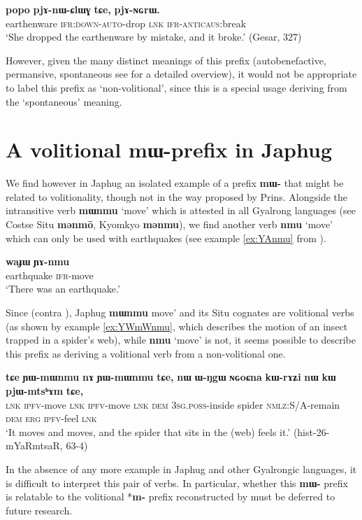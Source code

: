 \documentclass[oneside,a4paper,11pt]{article}
\newcommand{\ipa}[1]{\textbf{{\phon\mbox{#1}}}} %
\begin{document}
\begin{exe}
\ex \label{ex:pjAnWClWG}
\glt \ipa{popo} 	\ipa{pjɤ-nɯ-ɕlɯɣ} 	\ipa{tɕe,} 	\ipa{pjɤ-ɴɢrɯ.}  \\
earthenware \textsc{ifr:down-auto}-drop \textsc{lnk} \textsc{ifr-anticaus}:break \\
\glt `She dropped the earthenware by mistake, and it broke.' (Gesar, 327)
\end{exe}

 However, given the many distinct meanings of this prefix (autobenefactive,  permansive, spontaneous see \citet{jacques16japhug} for a detailed overview), it would not be appropriate to label this prefix as `non-volitional', since this is a special usage deriving from the `spontaneous' meaning.

\section{A volitional \ipa{mɯ-}prefix in Japhug}
We find however in Japhug an isolated example of a prefix \ipa{mɯ-} that might be related to volitionality, though not in the way proposed by Prins. Alongside the intransitive verb \ipa{mɯnmu} `move' which is attested in all Gyalrong languages (see Costse Situ \ipa{mənmō}, Kyomkyo \ipa{mənmu}), we find another verb \ipa{nmu} `move' which can only be used with earthquakes (see example \ref{ex:YAnmu} from \citealt{jacques16japhug}).

\begin{exe}
\ex \label{ex:YAnmu}
\gll
\ipa{waɟɯ} \ipa{ɲɤ-nmu} \\
earthquake \textsc{ifr}-move \\
\glt `There was an earthquake.'
\end{exe}

Since (contra \citealt[506]{prins16kyomkyo}), Japhug \ipa{mɯnmu}  move' and its Situ cognates are  volitional verbs (as shown by example  \ref{ex:YWmWnmu}, which describes the motion of an insect trapped in a spider's web), while \ipa{nmu} `move' is not, it seems possible to describe this prefix as deriving a volitional verb from a non-volitional one.

\begin{exe}
\ex \label{ex:YWmWnmu}
\gll
\ipa{tɕe}	\ipa{ɲɯ-mɯnmu}	\ipa{nɤ}	\ipa{ɲɯ-mɯnmu}	\ipa{tɕe,}	\ipa{nɯ}	\ipa{ɯ-ŋgɯ}	\ipa{ɴɢoɕna}	\ipa{kɯ-rɤʑi}	\ipa{nɯ}	\ipa{kɯ}	\ipa{pjɯ-mtsʰɤm}	\ipa{tɕe,} \\
\textsc{lnk} \textsc{ipfv}-move \textsc{lnk}  \textsc{ipfv}-move \textsc{lnk} \textsc{dem} \textsc{3sg.poss}-inside spider \textsc{nmlz}:S/A-remain \textsc{dem} \textsc{erg} \textsc{ipfv}-feel \textsc{lnk} \\
\glt `It moves and moves, and the spider that sits in the (web) feels it.' (hist-26-mYaRmtsaR, 63-4)
\end{exe}

In the absence of any more example in Japhug and other Gyalrongic languages, it is difficult to interpret this pair of verbs. In particular, whether this \ipa{mɯ-} prefix is relatable to the volitional *\ipa{m-} prefix reconstructed by \citet[55]{bs14oc} must be deferred to future research.



\end{document}
